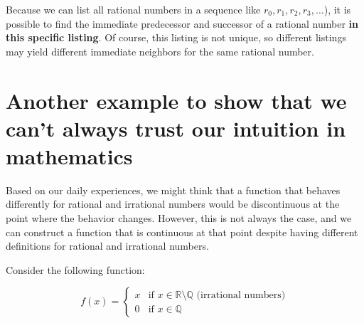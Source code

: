 \documentclass[12pt, letterpaper, oneside]{article}
\begin{document}
\begin{center}
\end{center}

Because we can list all rational numbers in a sequence like \(r_0, r_1, r_2, r_3, \ldots\)), it is possible to find the
immediate predecessor and successor of a rational number \textbf{in this specific listing}. Of course, this listing is
not unique, so different listings may yield different immediate neighbors for the same rational number.

\section{Another example to show that we can't always trust our intuition in mathematics}

Based on our daily experiences, we might think that a function that behaves differently for rational and irrational
numbers would be discontinuous at the point where the behavior changes. However, this is not always the case, and we can
construct a function that is continuous at that point despite having different definitions for rational and irrational
numbers.

Consider the following function:

\[
f(x) =
\begin{cases}
  x & \text{if } x \in \mathbb{R} \setminus \mathbb{Q} \text{ (irrational numbers)} \\
  0 & \text{if } x \in \mathbb{Q}
\end{cases}
\]
\end{document}

